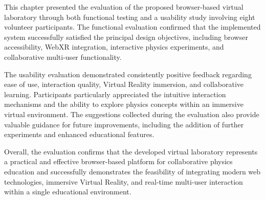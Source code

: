 This chapter presented the evaluation of the proposed browser-based virtual laboratory through both functional testing and a usability study involving eight volunteer participants. The functional evaluation confirmed that the implemented system successfully satisfied the principal design objectives, including browser accessibility, WebXR integration, interactive physics experiments, and collaborative multi-user functionality.

The usability evaluation demonstrated consistently positive feedback regarding ease of use, interaction quality, Virtual Reality immersion, and collaborative learning. Participants particularly appreciated the intuitive interaction mechanisms and the ability to explore physics concepts within an immersive virtual environment. The suggestions collected during the evaluation also provide valuable guidance for future improvements, including the addition of further experiments and enhanced educational features.

Overall, the evaluation confirms that the developed virtual laboratory represents a practical and effective browser-based platform for collaborative physics education and successfully demonstrates the feasibility of integrating modern web technologies, immersive Virtual Reality, and real-time multi-user interaction within a single educational environment.